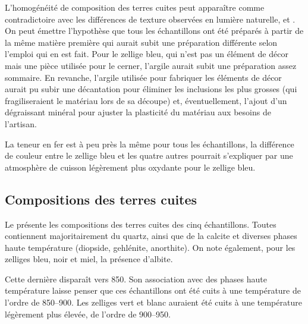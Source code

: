 L'homogénéité de composition des terres cuites peut apparaître comme 
contradictoire avec les différences de texture observées en lumière 
naturelle, \CL et \MEB[ie]. On peut émettre l'hypothèse que tous les 
échantillons ont été préparés à partir de la même matière première 
qui aurait subit une préparation différente selon l'emploi qui en est 
fait. Pour le zellige bleu, qui n'est pas un élément de décor mais une 
pièce utilisée pour le cerner, l'argile aurait subit une préparation 
assez sommaire. En revanche, l'argile utilisée pour fabriquer les 
éléments de décor aurait pu subir une décantation pour éliminer les 
inclusions les plus grosses (qui fragiliseraient le matériau lors de 
sa découpe) et, éventuellement, l'ajout d'un dégraissant minéral pour 
ajuster la plasticité du matériau aux besoins de l'artisan.

La teneur en fer est à peu près la même pour tous les échantillons, 
la différence de couleur entre le zellige bleu et les quatre autres 
pourrait s'expliquer par une atmosphère de cuisson légèrement plus 
oxydante pour le zellige bleu.

\subsection{Compositions \cristallos des terres cuites}
Le  présente les compositions \cristallos des terres cuites des cinq échantillons. Toutes contiennent majoritairement du quartz, ainsi que de la calcite et diverses phases haute température (diopside, gehlénite, anorthite). On note également, pour les zelliges bleu, noir et miel, la présence d'albite.

Cette dernière disparaît vers \SI{850}{\degC}. Son association avec des phases haute température laisse penser que ces échantillons ont été cuits à une température de l'ordre de \SIrange[range-phrase=\ à\ ]{850}{900}{\degC}. Les zelliges vert et blanc auraient été cuits à une température légèrement plus élevée, de l'ordre de \SIrange[range-phrase=\ à\ ]{900}{950}{\degC}.


